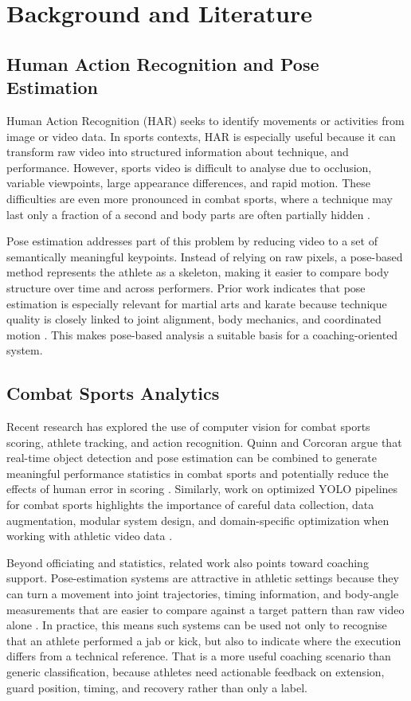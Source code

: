 \documentclass[12pt]{article}
\begin{document}
\section{Background and Literature}
\subsection{Human Action Recognition and Pose Estimation}
Human Action Recognition (HAR) seeks to identify movements or activities from image or video data. In sports contexts, HAR is especially useful because it can transform raw video into structured information about technique, and performance. However, sports video is difficult to analyse due to occlusion, variable viewpoints, large appearance differences, and rapid motion. These difficulties are even more pronounced in combat sports, where a technique may last only a fraction of a second and body parts are often partially hidden \cite{wu2024sthka}.

Pose estimation addresses part of this problem by reducing video to a set of semantically meaningful keypoints. Instead of relying on raw pixels, a pose-based method represents the athlete as a skeleton, making it easier to compare body structure over time and across performers. Prior work indicates that pose estimation is especially relevant for martial arts and karate because technique quality is closely linked to joint alignment, body mechanics, and coordinated motion \cite{echeverria2021pose}. This makes pose-based analysis a suitable basis for a coaching-oriented system.

\subsection{Combat Sports Analytics}
Recent research has explored the use of computer vision for combat sports scoring, athlete tracking, and action recognition. Quinn and Corcoran argue that real-time object detection and pose estimation can be combined to generate meaningful performance statistics in combat sports and potentially reduce the effects of human error in scoring \cite{quinn2024automation}. Similarly, work on optimized YOLO pipelines for combat sports highlights the importance of careful data collection, data augmentation, modular system design, and domain-specific optimization when working with athletic video data \cite{quinn2025yolo}.

Beyond officiating and statistics, related work also points toward coaching support. Pose-estimation systems are attractive in athletic settings because they can turn a movement into joint trajectories, timing information, and body-angle measurements that are easier to compare against a target pattern than raw video alone \cite{echeverria2021pose,wu2024sthka}. In practice, this means such systems can be used not only to recognise that an athlete performed a jab or kick, but also to indicate where the execution differs from a technical reference. That is a more useful coaching scenario than generic classification, because athletes need actionable feedback on extension, guard position, timing, and recovery rather than only a label.
\end{document}
